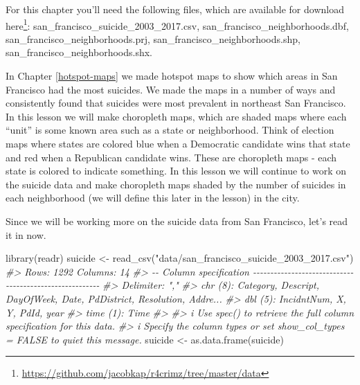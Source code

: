 \documentclass[
]{krantz}
\makeatletter
\newenvironment{Shaded}{\begin{snugshade}}{\end{snugshade}}
\newcommand{\CommentTok}[1]{\textcolor[rgb]{0.37,0.37,0.37}{\textit{#1}}}
\newcommand{\FunctionTok}[1]{\textcolor[rgb]{0,0,0}{#1}}
\newcommand{\NormalTok}[1]{#1}
\newcommand{\OtherTok}[1]{\textcolor[rgb]{0.37,0.37,0.37}{#1}}
\newcommand{\StringTok}[1]{\textcolor[rgb]{0.5,0.5,0.5}{#1}}
\renewcommand{\href}[2]{#2\footnote{\url{#1}}}
\newenvironment{kframe}{%
\medskip{}
\setlength{\fboxsep}{.8em}
 \def\at@end@of@kframe{}%
 \ifinner\ifhmode%
  \def\at@end@of@kframe{\end{minipage}}%
  \begin{minipage}{\columnwidth}%
 \fi\fi%
 \def\FrameCommand##1{\hskip\@totalleftmargin \hskip-\fboxsep
 \colorbox{shadecolor}{##1}\hskip-\fboxsep
     \hskip-\linewidth \hskip-\@totalleftmargin \hskip\columnwidth}%
 \MakeFramed {\advance\hsize-\width
   \@totalleftmargin\z@ \linewidth\hsize
   \@setminipage}}%
 {\par\unskip\endMakeFramed%
 \at@end@of@kframe}
\renewenvironment{Shaded}{\begin{kframe}}{\end{kframe}}
\makeatother
\begin{document}
For this chapter you'll need the following files, which are available for download \href{https://github.com/jacobkap/r4crimz/tree/master/data}{here}: san\_francisco\_suicide\_2003\_2017.csv, san\_francisco\_neighborhoods.dbf, san\_francisco\_neighborhoods.prj, san\_francisco\_neighborhoods.shp, san\_francisco\_neighborhoods.shx.

In Chapter \ref{hotspot-maps} we made hotspot maps to show which areas in San Francisco had the most suicides. We made the maps in a number of ways and consistently found that suicides were most prevalent in northeast San Francisco. In this lesson we will make choropleth maps, which are shaded maps where each ``unit'' is some known area such as a state or neighborhood. Think of election maps where states are colored blue when a Democratic candidate wins that state and red when a Republican candidate wins. These are choropleth maps - each state is colored to indicate something. In this lesson we will continue to work on the suicide data and make choropleth maps shaded by the number of suicides in each neighborhood (we will define this later in the lesson) in the city.

Since we will be working more on the suicide data from San Francisco, let's read it in now.

\begin{Shaded}
\begin{Highlighting}[]
\FunctionTok{library}\NormalTok{(readr)}
\NormalTok{suicide }\OtherTok{\textless{}{-}} \FunctionTok{read\_csv}\NormalTok{(}\StringTok{"data/san\_francisco\_suicide\_2003\_2017.csv"}\NormalTok{)}
\CommentTok{\#\textgreater{} Rows: 1292 Columns: 14}
\CommentTok{\#\textgreater{} {-}{-} Column specification {-}{-}{-}{-}{-}{-}{-}{-}{-}{-}{-}{-}{-}{-}{-}{-}{-}{-}{-}{-}{-}{-}{-}{-}{-}{-}{-}{-}{-}{-}{-}{-}{-}{-}{-}{-}{-}{-}{-}{-}{-}{-}{-}{-}{-}{-}{-}{-}{-}{-}{-}{-}{-}{-}{-}{-}}
\CommentTok{\#\textgreater{} Delimiter: ","}
\CommentTok{\#\textgreater{} chr  (8): Category, Descript, DayOfWeek, Date, PdDistrict, Resolution, Addre...}
\CommentTok{\#\textgreater{} dbl  (5): IncidntNum, X, Y, PdId, year}
\CommentTok{\#\textgreater{} time (1): Time}
\CommentTok{\#\textgreater{} }
\CommentTok{\#\textgreater{} i Use \textasciigrave{}spec()\textasciigrave{} to retrieve the full column specification for this data.}
\CommentTok{\#\textgreater{} i Specify the column types or set \textasciigrave{}show\_col\_types = FALSE\textasciigrave{} to quiet this message.}
\NormalTok{suicide }\OtherTok{\textless{}{-}} \FunctionTok{as.data.frame}\NormalTok{(suicide)}
\end{Highlighting}
\end{Shaded}
\end{document}
